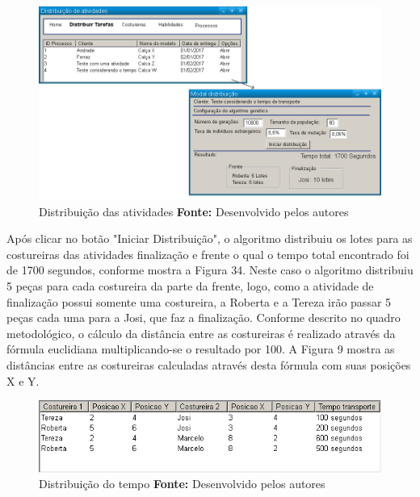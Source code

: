 \begin{figure}[h!]
	\centerline{\includegraphics[scale=0.3]{./imagens/test_case2_distribuicao.png}}
	\caption[Caso de teste tempo Costureira]
	{Distribuição das atividades \textbf{Fonte:} Desenvolvido pelos autores}
	\label{fig:exemplo1}
\end{figure}

\par Após clicar no botão "Iniciar Distribuição", o algoritmo distribuiu os lotes para as costureiras das atividades
 finalização e frente o qual o tempo total encontrado foi de 1700 segundos,
 conforme mostra a Figura 34. Neste caso o algoritmo distribuiu 5 peças para cada costureira da parte da frente, logo, como a atividade de finalização possui somente uma costureira,
 a Roberta e a Tereza irão passar 5 peças cada uma para a Josi, que faz a
 finalização. Conforme descrito no quadro metodológico, o cálculo da distância entre as costureiras é realizado através da fórmula euclidiana multiplicando-se o resultado por 100.
 A Figura 9 mostra as distâncias entre as costureiras calculadas através desta
 fórmula com suas posições X e Y.
  
  \newpage
  
  \begin{figure}[h!]
  	\centerline{\includegraphics[scale=0.7]{./imagens/test_case_2_tempo_distribuicao.png}}
  	\caption[Caso de teste tempo Costureira]
  	{Distribuição do tempo  \textbf{Fonte:} Desenvolvido pelos autores}
  	\label{fig:exemplo1}
  \end{figure}
 
